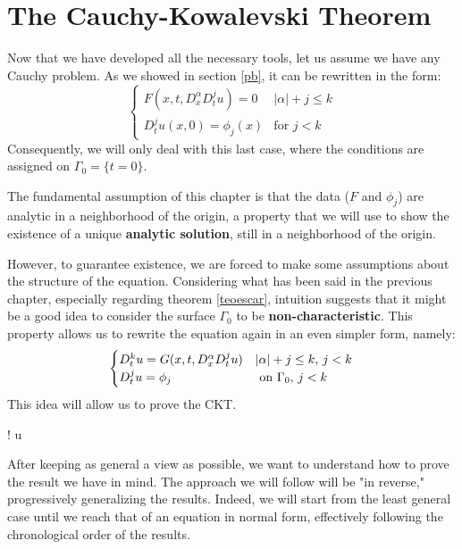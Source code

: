 \chapter{The Cauchy-Kowalevski Theorem} \label{invariant}

Now that we have developed all the necessary tools, let us assume we have any Cauchy problem. As we showed in section \ref{pb}, it can be rewritten in the form:
$$
\begin{cases}
F(x,t, D^\alpha_x D^j_t u)=0 & |\alpha | +j \leq k\\
D^j_t u (x,0)= \phi_j(x) & \text{for }j<k 
\end{cases}
$$
Consequently, we will only deal with this last case, where the conditions are assigned on $\Gamma_0=\{ t=0 \}$.

The fundamental assumption of this chapter is that the data ($F$ and $\phi_j$) are analytic in a neighborhood of the origin, a property that we will use to show the existence of a unique \textbf{analytic solution}, still in a neighborhood of the origin.

However, to guarantee existence, we are forced to make some assumptions about the structure of the equation. 
Considering what has been said in the previous chapter, especially regarding theorem \ref{teoescar}, intuition suggests that it might be a good idea to consider the surface $\Gamma_0$ to be \textbf{non-characteristic}. 
This property allows us to rewrite the equation again in an even simpler form, namely:
\begin{equation}\label{pbnorm}
\begin{cases}
D_{t}^k u = G(x,t, D^\alpha_x D^j_t u) & |\alpha |+ j \leq k, \, j<k \\ 
D_t^ju = \phi_j & \text{ on } \Gamma_0, \, j<k
\end{cases} \\ 
\end{equation}
This idea will allow us to prove the CKT.
\begin{namedtheorem}
{\exists ! \; u }
\end{namedtheorem}


After keeping as general a view as possible, we want to understand how to prove the result we have in mind. The approach we will follow will be "in reverse," progressively generalizing the results. Indeed, we will start from the least general case until we reach that of an equation in normal form, effectively following the chronological order of the results.


